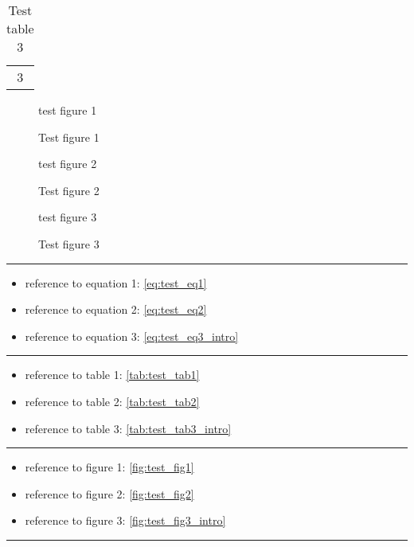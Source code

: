 \begin{table}
	\centering
	\begin{tabular}{c}
		3
	\end{tabular}
	\caption{Test table 3}
	\label{tab:test_tab3_intro}
\end{table}

%
\begin{figure}[h!]
	\centering
	test figure 1
	\caption{Test figure 1}
	\label{fig:test_fig1}
\end{figure}

\begin{figure}[h!]
	\centering
	test figure 2
	\caption{Test figure 2}
	\label{fig:test_fig2}
\end{figure}

\begin{figure}[h!]
	\centering
	test figure 3
	\caption{Test figure 3}
	\label{fig:test_fig3_intro}
\end{figure}

%
\hrule
\begin{itemize}
	\item reference to equation 1: \eqref{eq:test_eq1}
	\item reference to equation 2: \eqref{eq:test_eq2}
	\item reference to equation 3: \eqref{eq:test_eq3_intro}
\end{itemize}
\hrule
\begin{itemize}
	\item reference to table 1: \eqref{tab:test_tab1}
	\item reference to table 2: \eqref{tab:test_tab2}
	\item reference to table 3: \eqref{tab:test_tab3_intro}
\end{itemize}
\hrule
\begin{itemize}
	\item reference to figure 1: \eqref{fig:test_fig1}
	\item reference to figure 2: \eqref{fig:test_fig2}
	\item reference to figure 3: \eqref{fig:test_fig3_intro}
\end{itemize}
\hrule

%



%
\printbibliography
